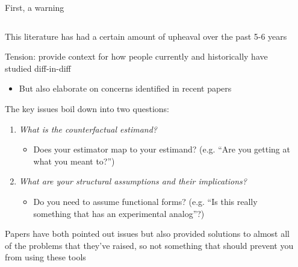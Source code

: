 \documentclass[notes,11pt, aspectratio=169]{beamer}
\newenvironment{wideitemize}{\itemize\addtolength{\itemsep}{10pt}}{\enditemize}
\begin{document}
\begin{frame}{First, a warning}
  \begin{columns}[T] %
    \begin{column}{.99\textwidth}
      \begin{wideitemize}
      \item This literature has had a certain amount of upheaval over the
        past 5-6 years
      \item Tension: provide context for how people currently and
        historically have studied diff-in-diff
        \begin{itemize}
        \item But also elaborate on concerns identified in recent papers
        \end{itemize}
      \item The key issues boil down into two questions:
        \begin{enumerate}
        \item \emph{What is the counterfactual estimand?}
          \begin{itemize}
            \item Does your estimator map to your estimand? (e.g. ``Are you getting at what you meant to?'')
          \end{itemize}
        \item \emph{What are your structural assumptions and their implications?}
          \begin{itemize}
          \item Do you need to assume functional forms? (e.g. ``Is
            this really something that has an experimental analog''?)
          \end{itemize}
        \end{enumerate}
      \item Papers have both pointed out issues but also provided
        solutions to almost all of the problems that they've raised,
        so not something that should prevent you from using these
        tools
      \end{wideitemize}
    \end{column}%
    \hfill%
    \begin{column}{.38\textwidth}
      
    \end{column}%
  \end{columns}
\end{frame}
\end{document}
